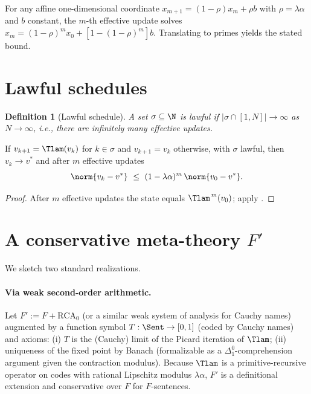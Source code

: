 \documentclass[12]{amsart}
\theoremstyle{plain}
\newtheorem{definition}[theorem]{Definition}
\begin{document}
\begin{remark}
For any affine one-dimensional coordinate $x_{m+1}=(1-\rho)x_m+\rho b$ with $\rho=\lambda\alpha$ and $b$ constant, the $m$-th effective update solves $x_m=(1-\rho)^m x_0+[1-(1-\rho)^m]b$. Translating to primes yields the stated bound.
\end{remark}

\section{Lawful schedules}\label{sec:lawful}

\begin{definition}[Lawful schedule]
A set $\sigma\subseteq\N$ is \emph{lawful} if $|\sigma\cap[1,N]|\to\infty$ as $N\to\infty$, i.e., there are infinitely many effective updates.
\end{definition}

\begin{corollary}\label{cor:lawful}
If $v_{k+1}=\Tlam(v_k)$ for $k\in\sigma$ and $v_{k+1}=v_k$ otherwise, with $\sigma$ lawful, then $v_k\to v^*$ and after $m$ effective updates
\[
\norm{v_k-v^*}\ \le\ (1-\lambda\alpha)^{m}\,\norm{v_0-v^*}.
\]
\end{corollary}

\begin{proof}
After $m$ effective updates the state equals $\Tlam^{\,m}(v_0)$; apply .
\end{proof}

\section{A conservative meta-theory $F'$}\label{sec:conservativity}

We sketch two standard realizations.

\paragraph{Via weak second-order arithmetic.}
Let $F' := F + \mathrm{RCA}_0$ (or a similar weak system of analysis for Cauchy names) augmented by a function symbol $T:\Sent\to[0,1]$ (coded by Cauchy names) and axioms:
(i) $T$ is the (Cauchy) limit of the Picard iteration of $\Tlam$; (ii) uniqueness of the fixed point by Banach (formalizable as a $\Delta^0_1$-comprehension argument given the contraction modulus).
Because $\Tlam$ is a primitive-recursive operator on codes with rational Lipschitz modulus $\lambda\alpha$, $F'$ is a definitional extension and conservative over $F$ for $F$-sentences.
\end{document}
